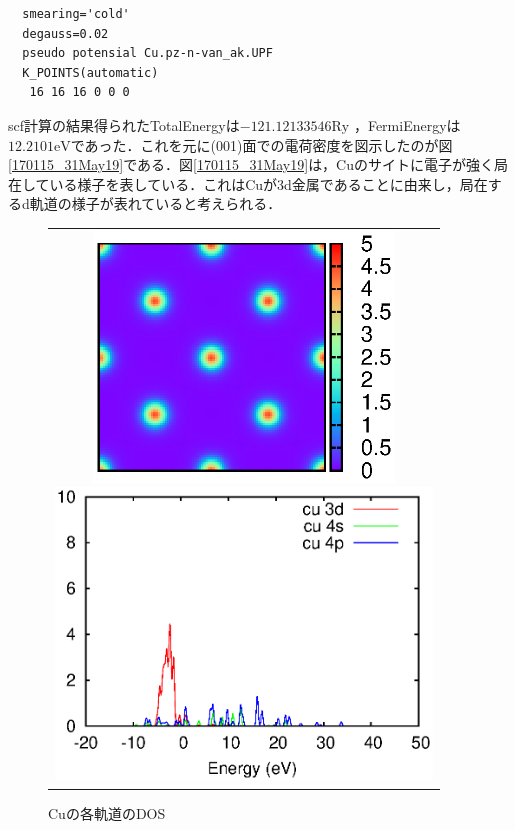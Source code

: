 \documentclass[a4j]{jarticle}
\begin{document}
  \begin{lstlisting}
  smearing='cold'
  degauss=0.02
  pseudo potensial Cu.pz-n-van_ak.UPF
  K_POINTS(automatic)
   16 16 16 0 0 0
  \end{lstlisting}
  scf計算の結果得られたTotalEnergyは$-121.12133546 \mathrm{Ry}$ ，FermiEnergyは$12.2101\mathrm{eV}$であった．これを元に(001)面での電荷密度を図示したのが図\ref{170115_31May19}である．図\ref{170115_31May19}は，Cuのサイトに電子が強く局在している様子を表している．これはCuが3d金属であることに由来し，局在するd軌道の様子が表れていると考えられる．
	 \begin{figure}[htb]
	   \begin{center}
	    \begin{tabular}[tb]{c}
	\begin{minipage}[cbt]{0.5\hsize}
\begin{center}
     \includegraphics[width=8cm]{charge2D.eps}
     \caption{Cuの電子密度分布}
 \label{170115_31May19}
 \end{center}
	\end{minipage}
       \begin{minipage}[cbt]{0.5\hsize}
\begin{center}
      \includegraphics[width=10cm]{copper_pdos.eps}
      \caption{Cuの各軌道のDOS}
 \label{171553_31May19}
 \end{center}
       \end{minipage}
	     	    \end{tabular}
	   \end{center}
	 \end{figure}
\end{document}

